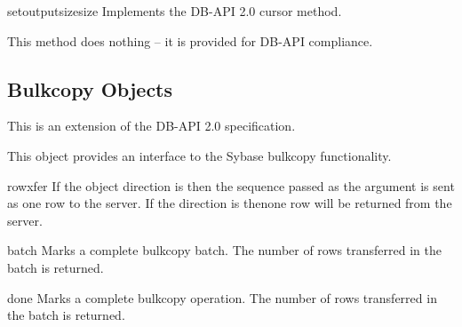 \begin{methoddesc}[Cursor]{setoutputsize}{size }
Implements the DB-API 2.0 cursor  method.

This method does nothing -- it is provided for DB-API compliance.
\end{methoddesc}

\subsection{Bulkcopy Objects}

This is an extension of the DB-API 2.0 specification.

This object provides an interface to the Sybase bulkcopy
functionality.

\begin{methoddesc}[Bulkcopy]{rowxfer}{}
If the  object direction is  then the
sequence passed as the  argument is sent as one row to the
server.  If the direction is  thenone row will be
returned from the server.
\end{methoddesc}

\begin{methoddesc}[Bulkcopy]{batch}{}
Marks a complete bulkcopy batch.  The number of rows transferred in
the batch is returned.
\end{methoddesc}

\begin{methoddesc}[Bulkcopy]{done}{}
Marks a complete bulkcopy operation.  The number of rows transferred
in the batch is returned.
\end{methoddesc}
